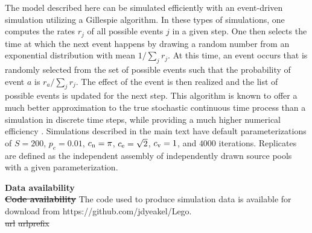 \documentclass[twocolumn,preprintnumbers,amsmath,amssymb,superscriptaddress,linenumbers]{revtex4-1}
\providecommand{\DIFadd}[1]{{\protect\color{blue}\uwave{#1}}} %
\providecommand{\DIFdel}[1]{{\protect\color{red}\sout{#1}}}                      %
\providecommand{\DIFaddbegin}{} %
\providecommand{\DIFaddend}{} %
\providecommand{\DIFdelbegin}{} %
\providecommand{\DIFdelend}{} %
\newcommand{\DIFscaledelfig}{0.5}
\newlength{\DIFdelgraphicswidth} %
\newlength{\DIFdelgraphicsheight} %
\newcommand{\DIFaddincludegraphics}[2][]{{\color{blue}\fbox{\DIFOincludegraphics[#1]{#2}}}} %
\newcommand{\DIFdelincludegraphics}[2][]{%
\sbox{\DIFdelgraphicsbox}{\DIFOincludegraphics[#1]{#2}}%
\settoboxwidth{\DIFdelgraphicswidth}{\DIFdelgraphicsbox} %
\settoboxtotalheight{\DIFdelgraphicsheight}{\DIFdelgraphicsbox} %
\scalebox{\DIFscaledelfig}{%
\parbox[b]{\DIFdelgraphicswidth}{\usebox{\DIFdelgraphicsbox}\\[-\baselineskip] \rule{\DIFdelgraphicswidth}{0em}}\llap{\resizebox{\DIFdelgraphicswidth}{\DIFdelgraphicsheight}{%
\setlength{\unitlength}{\DIFdelgraphicswidth}%
\begin{picture}(1,1)%
\thicklines\linethickness{2pt} %
{\color[rgb]{1,0,0}\put(0,0){\framebox(1,1){}}}%
{\color[rgb]{1,0,0}\put(0,0){\line( 1,1){1}}}%
{\color[rgb]{1,0,0}\put(0,1){\line(1,-1){1}}}%
\end{picture}%
}\hspace*{3pt}}} %
} %
\DeclareRobustCommand{\DIFaddbegin}{\DIFOaddbegin \let\includegraphics\DIFaddincludegraphics} %
\DeclareRobustCommand{\DIFaddend}{\DIFOaddend \let\includegraphics\DIFOincludegraphics} %
\DeclareRobustCommand{\DIFdelbegin}{\DIFOdelbegin \let\includegraphics\DIFdelincludegraphics} %
\DeclareRobustCommand{\DIFdelend}{\DIFOaddend \let\includegraphics\DIFOincludegraphics} %
\begin{document}
{  The model described here can be simulated efficiently with an event-driven simulation utilizing a Gillespie algorithm.
  In these types of simulations, one computes the rates $r_j$ of all possible events $j$ in a given step.
  One then selects the time at which the next event happens by drawing a random number from an exponential distribution with mean $1/\sum_j{r_j}$.
  At this time, an event occurs that is randomly selected from the set of possible events such that the probability of event $a$ is $r_a/\sum_j{r_j}$.
  The effect of the event is then realized and the list of possible events is updated for the next step.
  This algorithm is known to offer a much better approximation to the true stochastic continuous time process than a simulation in discrete time steps, while providing a much higher numerical efficiency \cite{Gillespie1977}.
  Simulations described in the main text have default parameterizations of $S=200$, $p_e=0.01$, $c_{\rm n} = \pi$, $c_{\rm e} = \sqrt{2}$, $c_{\rm v} = 1$, and $4000$ iterations.
  Replicates are defined as the independent assembly of independently drawn source pools with a given parameterization.}
\DIFaddend 

\vspace{2mm}
\noindent \textbf{Data \DIFaddbegin \DIFadd{and Code }\DIFaddend availability}\\
  \DIFdelbegin %
\textbf{\DIFdel{Code availability}}%
\DIFdelend \DIFaddbegin \footnotesize{
  The code used to produce simulation data is available for download from https://github.com/jdyeakel/Lego.
  }\DIFaddend \\

\DIFdelbegin %
\DIFdel{url}%
\DIFdel{urlprefix}%
\end{document}
